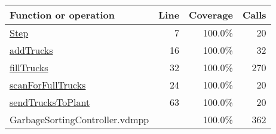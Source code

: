 \bigskip
\begin{longtable}{|l|r|r|r|}
\hline
Function or operation & Line & Coverage & Calls \\
\hline
\hline
\hyperref[Step:7]{Step} & 7&100.0\% & 20 \\
\hline
\hyperref[addTrucks:16]{addTrucks} & 16&100.0\% & 32 \\
\hline
\hyperref[fillTrucks:32]{fillTrucks} & 32&100.0\% & 270 \\
\hline
\hyperref[scanForFullTrucks:24]{scanForFullTrucks} & 24&100.0\% & 20 \\
\hline
\hyperref[sendTrucksToPlant:63]{sendTrucksToPlant} & 63&100.0\% & 20 \\
\hline
\hline
GarbageSortingController.vdmpp & & 100.0\% & 362 \\
\hline
\end{longtable}

